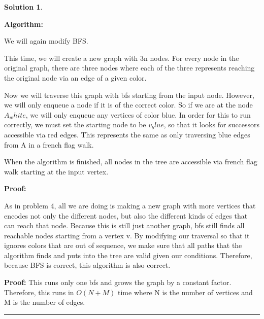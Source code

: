 \documentclass{article}
\theoremstyle{definition}
\def\fline{\rule{0.75\linewidth}{0.5pt}}
\newcommand{\finishline}{\begin{center}\fline\end{center}}
\newtheorem*{solution*}{Solution}
\newenvironment{solution}{\begin{solution*}}{{\finishline} \end{solution*}}
\begin{document}
\begin{solution}

    \

    \textbf{Algorithm: }

    We will again modify BFS.

    This time, we will create a new graph with 3n nodes. For every node in the original graph, there are three nodes where each of the three represents reaching the original node via an edge of a given color.

    Now we will traverse this graph with bfs starting from the input node. However, we will only enqueue a node if it is of the correct color. So if we are at the node $A_white$, we will only enqueue any vertices of color blue. In order for this to run correctly, we must set the starting node to be $v_blue$, so that it looks for successors accessible via red edges. This represents the same as only traversing blue edges from A in a french flag walk. 

    When the algorithm is finished, all nodes in the tree are accessible via french flag walk starting at the input vertex.




    \textbf{Proof: }
    
    As in problem 4, all we are doing is making a new graph with more vertices that encodes not only the different nodes, but also the different kinds of edges that can reach that node. Because this is still just another graph, bfs still finds all reachable nodes starting from a vertex v. By modifying our traversal so that it ignores colors that are out of sequence, we make sure that all paths that the algorithm finds and puts into the tree are valid given our conditions. Therefore, because BFS is correct, this algorithm is also correct. 



    \textbf{Proof: }
    This runs only one bfs and grows the graph by a constant factor. Therefore, this runs in $O(N+M)$ time where N is the number of vertices and M is the number of edges.


\end{solution}
\end{document}
